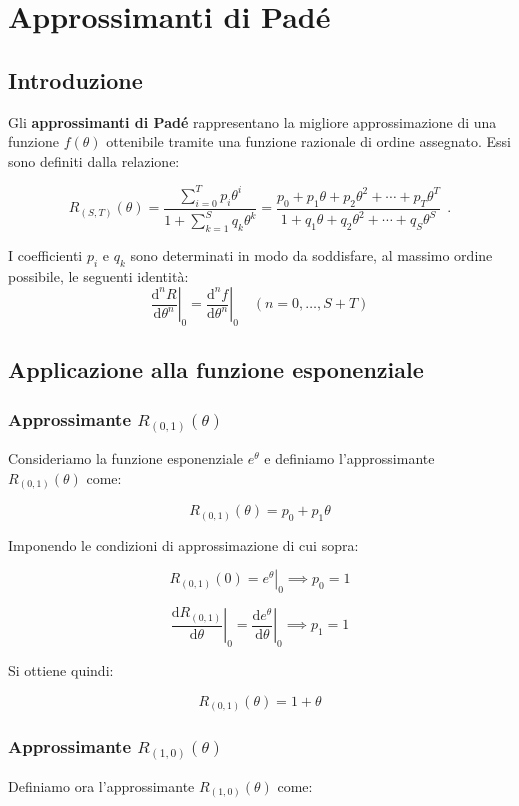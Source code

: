 \chapter{Approssimanti di Padé}
\section{Introduzione}
Gli \textbf{approssimanti di Padé} rappresentano la migliore approssimazione di una funzione $f(\theta)$  ottenibile tramite una funzione razionale di ordine assegnato. Essi sono definiti dalla relazione:

\[R_{(S, T)}(\theta) = \frac{\sum_{i=0}^{T} p_i \theta^i}{1 + \sum_{k=1}^{S} q_k \theta^k} = \frac{p_0 + p_1 \theta + p_2 \theta^2 + \cdots + p_T \theta^T}{1 + q_1 \theta + q_2 \theta^2 + \cdots + q_S \theta^S}\ \ .\]

I coefficienti  $p_i$  e  $q_k$  sono determinati in modo da soddisfare, al massimo ordine possibile, le seguenti identità:
\[\left. \frac{\mathrm{d}^n R}{\mathrm{d} \theta^n} \right|_0 = \left. \frac{\mathrm{d}^n f}{\mathrm{d} \theta^n} \right|_0 \quad (n = 0, \dots, S + T)\]

%
%
%  
\section{Applicazione alla funzione esponenziale}

\subsection{Approssimante $ R_{(0,1)}(\theta)$ }

Consideriamo la funzione esponenziale  $e^{\theta}$  e definiamo l’approssimante  $R_{(0,1)}(\theta)$  come:

\[R_{(0,1)}(\theta) = p_0 + p_1 \theta  \]

Imponendo le condizioni di approssimazione di cui sopra:

\[R_{(0,1)}(0) = \left. e^{\theta} \right|_0 \implies p_0 = 1  \]

\[\left. \frac{\mathrm{d} R_{(0,1)}}{\mathrm{d} \theta} \right|_0 = \left. \frac{\mathrm{d} e^{\theta}}{\mathrm{d} \theta} \right|_0 \implies p_1 = 1  \]

Si ottiene quindi:

\[R_{(0,1)}(\theta) = 1 + \theta  \]

%
\subsection{Approssimante  $R_{(1,0)}(\theta)$ }
Definiamo ora l’approssimante  $R_{(1,0)}(\theta)$  come:

